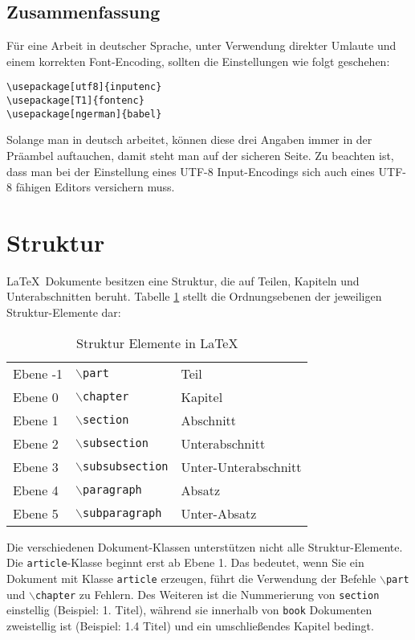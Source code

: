 \subsection{Zusammenfassung}

Für eine Arbeit in deutscher Sprache, unter Verwendung direkter Umlaute und einem korrekten Font-Encoding, sollten die Einstellungen wie folgt geschehen:
\begin{verbatim}
\usepackage[utf8]{inputenc}
\usepackage[T1]{fontenc}
\usepackage[ngerman]{babel}
\end{verbatim}

Solange man in deutsch arbeitet, können diese drei Angaben immer in der Präambel auftauchen, damit steht man auf der sicheren Seite. Zu beachten ist, dass man bei der Einstellung eines UTF-8 Input-Encodings sich auch eines UTF-8 fähigen Editors versichern muss. 

\section{Struktur}

\LaTeX\ Dokumente besitzen eine Struktur, die auf Teilen, Kapiteln und Unterabschnitten beruht. Tabelle \ref{tab:structure} stellt die Ordnungsebenen der jeweiligen Struktur-Elemente dar:

  
\begin{table}[h]
\centering
\begin{tabular}{l|l|l}
Ebene -1 & \texttt{$\backslash$part} & Teil \\
Ebene 0 & \texttt{$\backslash$chapter} & Kapitel \\
Ebene 1 & \texttt{$\backslash$section} & Abschnitt \\
Ebene 2 & \texttt{$\backslash$subsection} & Unterabschnitt \\
Ebene 3 & \texttt{$\backslash$subsubsection} & Unter-Unterabschnitt \\
Ebene 4 & \texttt{$\backslash$paragraph} & Absatz \\
Ebene 5 & \texttt{$\backslash$subparagraph} & Unter-Absatz \\
\end{tabular}
\caption{Struktur Elemente in \LaTeX}
\label{tab:structure}
\end{table}

Die verschiedenen Dokument-Klassen unterstützen nicht alle Struktur-E\-le\-men\-te. Die \texttt{article}-Klasse beginnt erst ab Ebene 1. Das bedeutet, wenn Sie ein Dokument mit Klasse \texttt{article} erzeugen, führt die Verwendung der Befehle \texttt{$\backslash$part} und \texttt{$\backslash$chapter} zu Fehlern. Des Weiteren ist die Nummerierung von \texttt{section} einstellig (Beispiel: 1. Titel), während sie innerhalb von \texttt{book} Dokumenten zweistellig ist (Beispiel: 1.4 Titel) und ein umschließendes Kapitel bedingt. 


